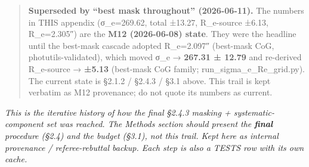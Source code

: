 \documentclass[
]{article}
\newcommand{\BreakablePath}[1]{{\ttfamily\sloppy #1}}
\begin{document}
\begin{quote}
\textbf{Superseded by ``best mask throughout'' (2026-06-11).} The
numbers in THIS appendix (σ\_e=269.62, total ±13.27, R\_e-source ±6.13,
R\_e=2.305″) are the \textbf{M12 (2026-06-08) state}. They were the
headline until the best-mask cascade adopted R\_e=2.097″ (best-mask CoG,
photutils-validated), which moved σ\_e → \textbf{267.31 ± 12.79} and
re-derived R\_e-source → \textbf{±5.13} (best-mask CoG family;
\BreakablePath{run\_\discretionary{}{}{}sigma\_\discretionary{}{}{}e\_\discretionary{}{}{}Re\_\discretionary{}{}{}grid.\discretionary{}{}{}py}).
The current state is §2.1.2 / §2.4.3 / §3.1 above. This trail is kept
verbatim as M12 provenance; do not quote its numbers as current.
\end{quote}

\emph{This is the iterative history of how the final §2.4.3 masking +
systematic-component set was reached. The Methods section should present
the \textbf{final} procedure (§2.4) and the budget (§3.1), not this
trail. Kept here as internal provenance / referee-rebuttal backup. Each
step is also a \BreakablePath{TESTS} row with its own cache.}
\end{document}

